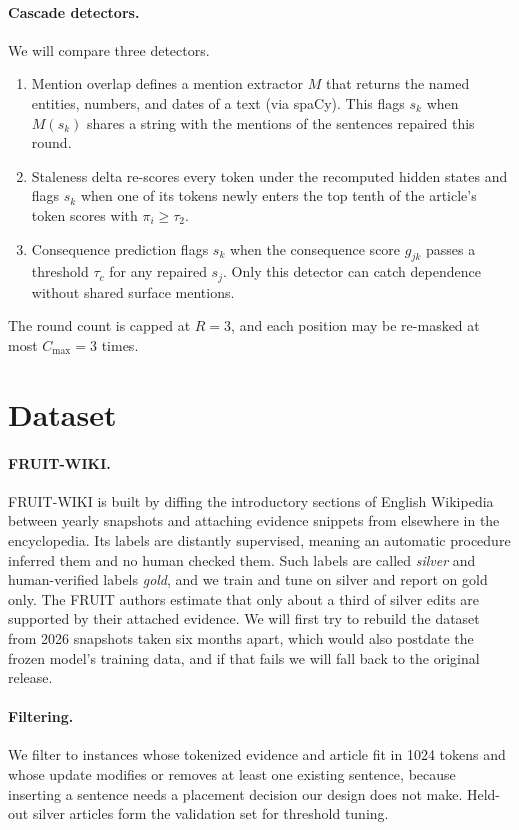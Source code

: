 \documentclass[11pt]{article}
\begin{document}
\paragraph{Cascade detectors.}
We will compare three detectors.

\begin{enumerate}[label=(\alph*)]
    \item Mention overlap defines a mention extractor $M$ that returns the named entities, numbers, and dates of a text (via spaCy). This flags $s_k$ when $M(s_k)$ shares a string with the mentions of the sentences repaired this round.
    \item Staleness delta re-scores every token under the recomputed hidden states and flags $s_k$ when one of its tokens newly enters the top tenth of the article's token scores with $\pi_i \ge \tau_2$.
    \item Consequence prediction flags $s_k$ when the consequence score $g_{jk}$ passes a threshold $\tau_c$ for any repaired $s_j$. Only this detector can catch dependence without shared surface mentions.
\end{enumerate}

The round count is capped at $R = 3$, and each position may be re-masked at most $C_{\max} = 3$ times.

\section{Dataset}
\label{sec:data}

\paragraph{FRUIT-WIKI.}
FRUIT-WIKI \citep{iv-etal-2022-fruit} is built by diffing the introductory sections of English Wikipedia between yearly snapshots and attaching evidence snippets from elsewhere in the encyclopedia. Its labels are distantly supervised, meaning an automatic procedure inferred them and no human checked them. Such labels are called \emph{silver} and human-verified labels \emph{gold}, and we train and tune on silver and report on gold only. The FRUIT authors estimate that only about a third of silver edits are supported by their attached evidence. We will first try to rebuild the dataset from 2026 snapshots taken six months apart, which would also postdate the frozen model's training data, and if that fails we will fall back to the original release.

\paragraph{Filtering.}
We filter to instances whose tokenized evidence and article fit in 1024 tokens and whose update modifies or removes at least one existing sentence, because inserting a sentence needs a placement decision our design does not make. Held-out silver articles form the validation set for threshold tuning.
\end{document}
